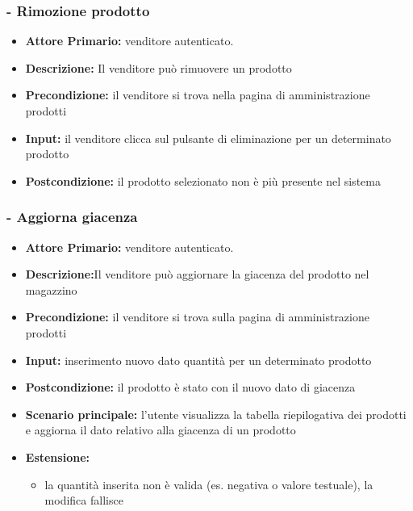 \stepsubUserCase
\subsubsection{- Rimozione prodotto}
\begin{itemize}
    \item \textbf{Attore Primario:}  venditore autenticato.
    \item \textbf{Descrizione:} Il venditore può rimuovere un prodotto
    \item \textbf{Precondizione:} il venditore si trova nella pagina di amministrazione prodotti
    \item \textbf{Input:} il venditore clicca sul pulsante di eliminazione per un determinato prodotto
    \item \textbf{Postcondizione:} il prodotto selezionato non è più presente nel sistema 
\end{itemize}

\stepsubUserCase
\subsubsection{- Aggiorna giacenza}
\begin{itemize}
    \item \textbf{Attore Primario:}  venditore autenticato.
    \item \textbf{Descrizione:}Il venditore può aggiornare la giacenza del prodotto nel magazzino
    \item \textbf{Precondizione:} il venditore si trova sulla pagina di amministrazione prodotti
    \item \textbf{Input:} inserimento nuovo dato quantità per un determinato prodotto
    \item \textbf{Postcondizione:} il prodotto è stato con il nuovo dato di giacenza
    \item \textbf{Scenario principale:} l’utente visualizza la tabella riepilogativa dei prodotti e aggiorna il dato relativo alla giacenza di un prodotto
    \item \textbf{Estensione:}
    \begin{itemize}
        \item la quantità inserita non è valida (es. negativa o valore testuale), la modifica fallisce
    \end{itemize}
\end{itemize}

\stepUserCase
